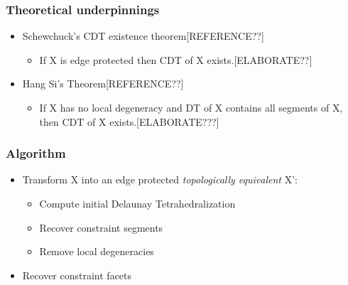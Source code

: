 \documentclass{beamer}
\begin{document}
	\begin{frame}
		\frametitle{Theoretical underpinnings}
			\begin{itemize}
				\item	Schewchuck's CDT existence theorem[REFERENCE??]
					\begin{itemize}
						\item If X is edge protected then CDT of X exists.[ELABORATE??]	
					\end{itemize}		
				\item	Hang Si's Theorem[REFERENCE??]
					\begin{itemize}
						\item If X has no local degeneracy and DT of X contains all segments of X, then CDT of X exists.[ELABORATE???] 
					\end{itemize}		
			\end{itemize}		
	\end{frame}	
	\begin{frame}
		\frametitle{Algorithm} 
			\begin{itemize}
				\item Transform X into an edge protected \textit{topologically equivalent} X':	
				\begin{itemize}
					\item Compute initial Delaunay Tetrahedralization	
					\item Recover constraint segments
					\item Remove local degeneracies
				\end{itemize}
				\item Recover constraint facets
			\end{itemize}		
	\end{frame}
\end{document}
